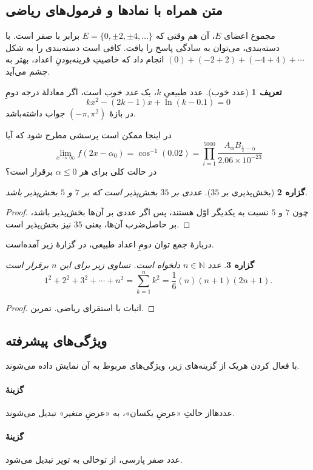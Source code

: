 \documentclass[10pt,a5paper]{article}
\theoremstyle{definition}
\newtheorem{definition}{تعریف}[section]
\theoremstyle{plain}
\newtheorem{proposition}[definition]{گزاره}
\begin{document}
\subsection{متن همراه با نمادها و فرمول‌های ریاضی}
مجموع اعضای $E$، آن هم وقتی که $E=\{0,\pm2,\pm4,\ldots\}$ برابر با صفر است. با دسته‌بندی، می‌توان به سادگی پاسخ را یافت. کافی است دسته‌بندی را به شکل $(0)+(-2+2)+(-4+4)+\cdots$ انجام داد که خاصیتِ قرینه‌بودنِ اعداد، بهتر به چشم می‌آید.
\begin{definition}[عدد خوب]
عدد طبیعیِ $k$، یک \emph{عدد خوب }است، اگر معادلۀ درجه دومِ
\[kx^2-(2k-1)x+\ln(k-0.1)=0\]
در بازۀ $(-\pi,\pi^2)$ جواب داشته‌باشد.
\end{definition}
در اینجا ممکن است پرسشی مطرح شود که آیا
\[\lim_{x\to\infty} f(2x-\alpha_0)=\cos^{-1}(0.02)
=\prod_{i=1}^{5000} \frac{A_\alpha B_{\frac{1}{2}-\alpha}}{2.06\times10^{-23}}
\]
در حالت کلی برای هر $\alpha\leq0$ برقرار است؟

\begin{proposition}[بخش‌پذیری بر $35$]
عددی بر $35$ بخش‌پذیر است که بر $7$ و $5$ بخش‌پذیر باشد.
\end{proposition}

\begin{proof}
چون $7$ و $5$ نسبت به یکدیگر اوّل هستند، پس اگر عددی بر آن‌ها بخش‌پذیر باشد، بر حاصل‌ضرب آن‌ها، یعنی $35$ نیز بخش‌پذیر است. 
\end{proof}

دربارۀ جمع توان دومِ اعداد طبیعی، در گزارۀ زیر آمده‌است.

\begin{proposition}
عدد $n\in\mathbb{N}$ دلخواه است. تساوی زیر برای این $n$ برقرار است
\[
1^2+2^2+3^2+\cdots+n^2=\sum_{k=1}^n k^2 = \frac{1}{6}(n)(n+1)(2n+1).
\]
\end{proposition}

\begin{proof}
اثبات با استقرای ریاضی. تمرین.
\end{proof}


\subsection{ویژگی‌های پیشرفته}
با فعال کردن هریک از گزینه‌های زیر، ویژگی‌های مربوط به آن نمایش داده می‌شوند.
\paragraph*{گزینۀ }
عددهااز حالتِ «عرضِ یکسان»، به «عرضِ متغیر» تبدیل می‌شوند.
\paragraph*{گزینۀ }
عدد صفر پارسی، از توخالی به توپر تبدیل می‌شود.
\end{document}

